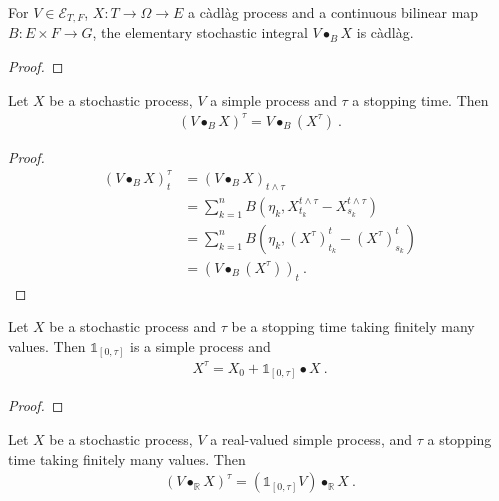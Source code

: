 \begin{lemma}\label{lem:cadlag_elemStochIntegralBilin}
For $V \in \mathcal{E}_{T, F}$, $X : T \to \Omega \to E$ a càdlàg process and a continuous bilinear map $B: E \times F \to G$, the elementary stochastic integral $V \bullet_B X$ is càdlàg.
\end{lemma}

\begin{proof}

\end{proof}


\begin{lemma}\label{lem:elemStochIntegral_stoppedProcess}
  \leanok
Let $X$ be a stochastic process, $V$ a simple process and $τ$ a stopping time.
Then
\begin{align*}
  (V \bullet_B X)^τ = V \bullet_B (X^τ)
  \: .
\end{align*}
\end{lemma}

\begin{proof}
  \leanok
\begin{align*}
  (V \bullet_B X)^\tau_t
  &= (V \bullet_B X)_{t \wedge \tau}
  \\
  &= \sum_{k=1}^{n} B (\eta_k, X^{t \wedge \tau}_{t_k} - X^{t \wedge \tau}_{s_k})
  \\
  &= \sum_{k=1}^{n} B (\eta_k, (X^{\tau})^t_{t_k} - (X^{\tau})^t_{s_k})
  \\
  &= (V \bullet_B (X^{\tau}))_t
  \: .
\end{align*}
\end{proof}

\begin{lemma}\label{lem:stoppedProcess_eq_elemStochIntegral}
  \notready
Let $X$ be a stochastic process and $τ$ be a stopping time taking finitely many values.
Then $\mathbb{1}_{[0, τ]}$ is a simple process and
\begin{align*}
  X^τ = X_0 + \mathbb{1}_{[0, τ]} \bullet X
  \: .
\end{align*}
\end{lemma}

\begin{proof}

\end{proof}


\begin{lemma}\label{lem:elemStochIntegral_stoppedIntegrator}
Let $X$ be a stochastic process,
$V$ a real-valued %
simple process,
and $τ$ a stopping time taking finitely many values.
Then
\begin{align*}
  (V \bullet_{\mathbb{R}} X)^τ = (\mathbb{1}_{[0,τ]}V) \bullet_{\mathbb{R}} X
  \: .
\end{align*}
\end{lemma}

